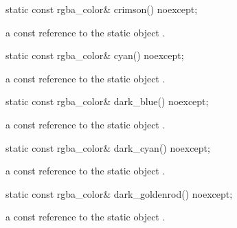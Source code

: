 \begin{itemdecl}
    static const rgba_color& crimson() noexcept;
\end{itemdecl}
\begin{itemdescr}
    \pnum
    \returns
    a const reference to the static  object .
\end{itemdescr}

\begin{itemdecl}
    static const rgba_color& cyan() noexcept;
\end{itemdecl}
\begin{itemdescr}
    \pnum
    \returns
    a const reference to the static  object .
\end{itemdescr}

\begin{itemdecl}
    static const rgba_color& dark_blue() noexcept;
\end{itemdecl}
\begin{itemdescr}
    \pnum
    \returns
    a const reference to the static  object .
\end{itemdescr}

\begin{itemdecl}
    static const rgba_color& dark_cyan() noexcept;
\end{itemdecl}
\begin{itemdescr}
    \pnum
    \returns
    a const reference to the static  object .
\end{itemdescr}

\begin{itemdecl}
    static const rgba_color& dark_goldenrod() noexcept;
\end{itemdecl}
\begin{itemdescr}
    \pnum
    \returns
    a const reference to the static  object .
\end{itemdescr}

